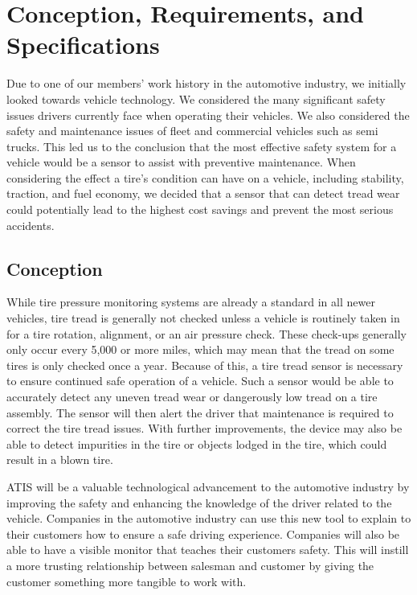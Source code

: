\documentclass[11pt]{IEEEtran}
\begin{document}
	\section{Conception, Requirements, and Specifications}
		Due to one of our members’ work history in the automotive industry, we initially looked towards vehicle technology. We considered the many significant safety issues drivers currently face when operating their vehicles. We also considered the safety and maintenance issues of fleet and commercial vehicles such as semi trucks. This led us to the conclusion that the most effective safety system for a vehicle would be a sensor to assist with preventive maintenance. When considering the effect a tire’s condition can have on a vehicle, including stability, traction, and fuel economy, we decided that a sensor that can detect tread wear could potentially lead to the highest cost savings and prevent the most serious accidents.

		\subsection{Conception}
			While tire pressure monitoring systems are already a standard in all newer vehicles, tire tread is generally not checked unless a vehicle is routinely taken in for a tire rotation, alignment, or an air pressure check. These check-ups generally only occur every 5,000 or more miles, which may mean that the tread on some tires is only checked once a year. Because of this, a tire tread sensor is necessary to ensure continued safe operation of a vehicle. Such a sensor would be able to accurately detect any uneven tread wear or dangerously low tread on a tire assembly. The sensor will then alert the driver that maintenance is required to correct the tire tread issues. With further improvements, the device may also be able to detect impurities in the tire or objects lodged in the tire, which could result in a blown tire.

			ATIS will be a valuable technological advancement to the automotive industry by improving the safety and enhancing the knowledge of the driver related to the vehicle. Companies in the automotive industry can use this new tool to explain to their customers how to ensure a safe driving experience. Companies will also be able to have a visible monitor that teaches their customers safety. This will instill a more trusting relationship between salesman and customer by giving the customer something more tangible to work with.
\end{document}
